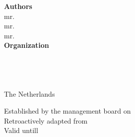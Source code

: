 \documentclass[10pt,a4paper,oneside]{article}
\begin{document}
\begin{titlepage}
    \begin{center}
    \vspace*{3cm}
    {\Huge\thetitle}
    
    \vspace*{0.4cm}
    \textnormal{\ondertitel}
    \end{center}
    
    \raggedleft
    \vfill
    \textbf{Authors} \\
    mr. \theauthor \\
    mr. \begeleidertwee \\
    mr. \begeleidereen \\

    \vspace{\vertspace}
    \textbf{Organization} \\
    \organisatie \\
    \mailorganisatie \\
    \telorganisatie \\
    \adres \\
    The Netherlands
    
    \vspace{\vertspace}
    Established by the management board on \thedate \\
    Retroactively adapted from \terugwerkend \\
    Valid untill \uittreden
\end{titlepage}
\end{document}
